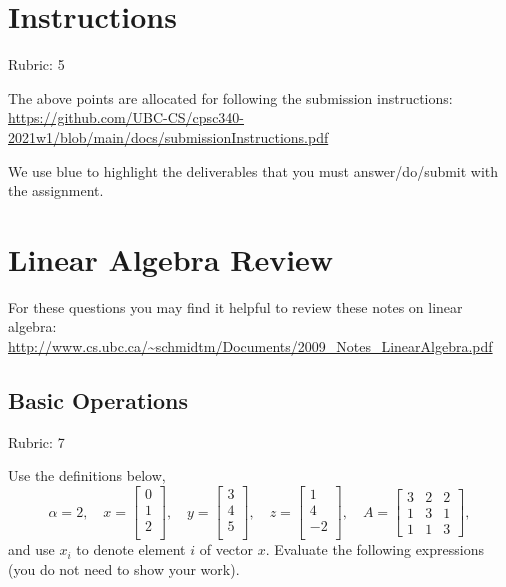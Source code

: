 \documentclass{article}
\newcommand{\rubric}[1]{\green{Rubric: #1}}
\newcommand{\blue}[1]{{\color{blue}#1}}
\newcommand{\green}[1]{{\color{green}#1}}
\begin{document}
    \section*{Instructions}
    \rubric{5}

    The above points are allocated for following the submission instructions:\\
    \url{https://github.com/UBC-CS/cpsc340-2021w1/blob/main/docs/submissionInstructions.pdf}

    \vspace{1em}
    We use \blue{blue} to highlight the deliverables that you must answer/do/submit with the assignment.

    \section{Linear Algebra Review}
    For these questions you may find it helpful to review these notes on linear algebra:\\
    \url{http://www.cs.ubc.ca/~schmidtm/Documents/2009_Notes_LinearAlgebra.pdf}

    \subsection{Basic Operations}
    \rubric{7}

    Use the definitions below,
    \[
    \alpha = 2,\quad
    x = \left[\begin{array}{c}
        0\\
        1\\
        2\\
    \end{array}\right], \quad
    y = \left[\begin{array}{c}
        3\\
        4\\
        5\\
    \end{array}\right],\quad
    z = \left[\begin{array}{c}
        1\\
        4\\
        -2\\
    \end{array}\right],\quad
    A = \left[\begin{array}{ccc}
        3 & 2 & 2\\
        1 & 3 & 1\\
        1 & 1 & 3
    \end{array}\right],
    \]
    and use $x_i$ to denote element $i$ of vector $x$.
    \blue{Evaluate the following expressions} (you do not need to show your work).
\end{document}
